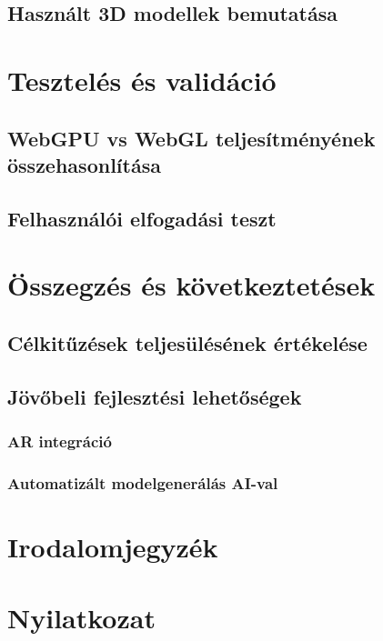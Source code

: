 \documentclass[12pt]{report}
\begin{document}
        \section{Használt 3D modellek bemutatása}
        
        \chapter{Tesztelés és validáció}
        \section{WebGPU vs WebGL teljesítményének összehasonlítása}
        \section{Felhasználói elfogadási teszt}
        
        \chapter{Összegzés és következtetések}
        \section{Célkitűzések teljesülésének értékelése}
        \section{Jövőbeli fejlesztési lehetőségek}
        \subsection{AR integráció}
        \subsection{Automatizált modelgenerálás AI-val}
        
        \chapter*{Irodalomjegyzék}
        
        \chapter*{Nyilatkozat}
        
\end{document}
